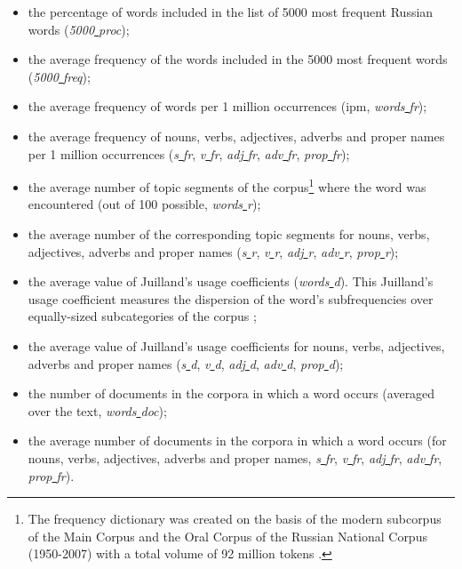 \documentclass[runningheads]{llncs}
\begin{document}
\begin{enumerate}
    \begin{itemize}
        \item the percentage of words included in the list of 5000 most frequent Russian words (\textit{5000\underline{ }proc});
        \item the average frequency of the words included in the 5000 most frequent words (\textit{5000\underline{ }freq});
        \item the average frequency of words per 1 million occurrences (ipm, \textit{words\underline{ }fr});
        \item the average frequency of nouns, verbs, adjectives, adverbs and proper names per 1 million occurrences (\textit{s\underline{ }fr}, \textit{v\underline{ }fr}, \textit{adj\underline{ }fr}, \textit{adv\underline{ }fr}, \textit{prop\underline{ }fr});
        \item the average number of topic segments of the corpus\footnote{The frequency dictionary was created on the basis of the modern subcorpus of the Main Corpus and the Oral Corpus of the Russian National Corpus (1950-2007) \cite{RNC} with a total volume of 92 million tokens \cite{Lyashevskaya}.} where the word was encountered (out of 100 possible, \textit{words\underline{ }r});
        \item the average number of the corresponding topic segments for nouns, verbs, adjectives, adverbs and proper names (\textit{s\underline{ }r}, \textit{v\underline{ }r}, \textit{adj\underline{ }r}, \textit{adv\underline{ }r}, \textit{prop\underline{ }r});
        \item the average value of Juilland's usage coefficients (\textit{words\underline{ }d}). This Juilland's usage coefficient measures the dispersion of the word's subfrequencies over    equally-sized  subcategories of the corpus \cite{Juilland};
        \item the average value of Juilland's usage coefficients for nouns, verbs, adjectives, adverbs and proper names (\textit{s\underline{ }d}, \textit{v\underline{ }d}, \textit{adj\underline{ }d}, \textit{adv\underline{ }d}, \textit{prop\underline{ }d});
        \item the number of documents in the corpora in which a word occurs (averaged over the text, \textit{words\underline{ }doc});
        \item the average number of documents in the corpora in which a word occurs (for nouns, verbs, adjectives, adverbs and proper names, \textit{s\underline{ }fr}, \textit{v\underline{ }fr}, \textit{adj\underline{ }fr}, \textit{adv\underline{ }fr}, \textit{prop\underline{ }fr}).

\end{itemize}
\end{enumerate}
\end{document}
